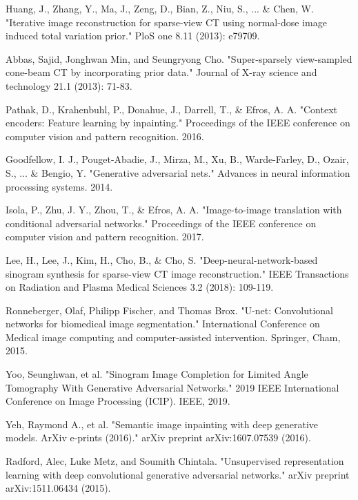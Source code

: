 \begin{thebibliography}{00}
Huang, J., Zhang, Y., Ma, J., Zeng, D., Bian, Z., Niu, S., ... \& Chen, W. "Iterative image reconstruction for sparse-view CT using normal-dose image induced total variation prior." PloS one 8.11 (2013): e79709.

Abbas, Sajid, Jonghwan Min, and Seungryong Cho. "Super-sparsely view-sampled cone-beam CT by incorporating prior data." Journal of X-ray science and technology 21.1 (2013): 71-83.

Pathak, D., Krahenbuhl, P., Donahue, J., Darrell, T., \& Efros, A. A. "Context encoders: Feature learning by inpainting." Proceedings of the IEEE conference on computer vision and pattern recognition. 2016.

Goodfellow, I. J., Pouget-Abadie, J., Mirza, M., Xu, B., Warde-Farley, D., Ozair, S., ... \& Bengio, Y. "Generative adversarial nets." Advances in neural information processing systems. 2014. 

Isola, P., Zhu, J. Y., Zhou, T., \& Efros, A. A. "Image-to-image translation with conditional adversarial networks." Proceedings of the IEEE conference on computer vision and pattern recognition. 2017.

Lee, H., Lee, J., Kim, H., Cho, B., \& Cho, S.  "Deep-neural-network-based sinogram synthesis for sparse-view CT image reconstruction." IEEE Transactions on Radiation and Plasma Medical Sciences 3.2 (2018): 109-119.

Ronneberger, Olaf, Philipp Fischer, and Thomas Brox. "U-net: Convolutional networks for biomedical image segmentation." International Conference on Medical image computing and computer-assisted intervention. Springer, Cham, 2015.

 Yoo, Seunghwan, et al. "Sinogram Image Completion for Limited Angle Tomography With Generative Adversarial Networks." 2019 IEEE International Conference on Image Processing (ICIP). IEEE, 2019.

 Yeh, Raymond A., et al. "Semantic image inpainting with deep generative models. ArXiv e-prints (2016)." arXiv preprint arXiv:1607.07539 (2016).

Radford, Alec, Luke Metz, and Soumith Chintala. "Unsupervised representation learning with deep convolutional generative adversarial networks." arXiv preprint arXiv:1511.06434 (2015).


\end{thebibliography}
